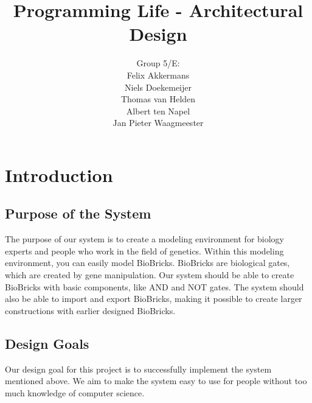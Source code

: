 \documentclass[a4paper]{article}
\title{Programming Life - Architectural Design }
\author{Group 5/E:\\
Felix Akkermans \\
Niels Doekemeijer \\
Thomas van Helden \\
Albert ten Napel \\
Jan Pieter Waagmeester}
\begin{document}
\maketitle

\vfill

\small{\tableofcontents}
\pagebreak
\section{Introduction}
\subsection{Purpose of the System}
The purpose of our system is to create a modeling environment for biology experts and people who work in the field of genetics. Within this modeling environment, you can easily model BioBricks. BioBricks are biological gates, which are created by gene manipulation. Our system should be able to create BioBricks with basic components, like AND and NOT gates. The system should also be able to import and export BioBricks, making it possible to create larger constructions with earlier designed BioBricks.
\subsection{Design Goals}
Our design goal for this project is to successfully implement the system mentioned above. We aim to make the system easy to use for people without too much knowledge of computer science.
\end{document}
